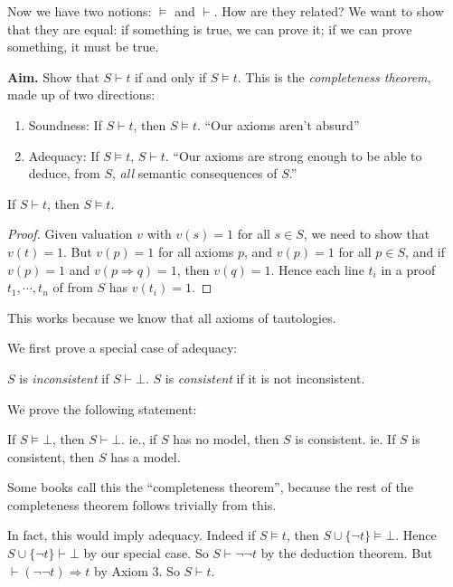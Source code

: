 \documentclass[a4paper]{article}
\begin{document}
Now we have two notions: $\models$ and $\vdash$. How are they related? We want to show that they are equal: if something is true, we can prove it; if we can prove something, it must be true.

\noindent\textbf{Aim.} Show that $S\vdash t$ if and only if $S\models t$.
This is the \emph{completeness theorem}, made up of two directions:
\begin{enumerate}
  \item Soundness: If $S\vdash t$, then $S\models t$. ``Our axioms aren't absurd''
  \item Adequacy: If $S\models t$, $S\vdash t$.  ``Our axioms are strong enough to be able to deduce, from $S$, \emph{all} semantic consequences of $S$.''
\end{enumerate}

\begin{prop}
  If $S\vdash t$, then $S\models t$.
\end{prop}

\begin{proof}
  Given valuation $v$ with $v(s) = 1$ for all $s\in S$, we need to show that $v(t) = 1$. But $v(p) = 1$ for all axioms $p$, and $v(p) = 1$ for all $p\in S$, and if $v(p) = 1$ and $v(p\Rightarrow q) = 1$, then $v(q) = 1$. Hence each line $t_i$ in a proof $t_1, \cdots, t_n$ of from $S$ has $v(t_i) = 1$. 
\end{proof}
This works because we know that all axioms of tautologies.

We first prove a special case of adequacy:
\begin{defi}[Consistent]
  $S$ is \emph{inconsistent} if $S\vdash \bot$. $S$ is \emph{consistent} if it is not inconsistent.
\end{defi}

We prove the following statement:
\begin{thm}
  If $S\models \bot$, then $S\vdash \bot$. ie., if $S$ has no model, then $S$ is consistent. ie. If $S$ is consistent, then $S$ has a model.

  \note Some books call this the ``completeness theorem'', because the rest of the completeness theorem follows trivially from this. 
\end{thm}

In fact, this would imply adequacy. Indeed if $S\models t$, then  $S\cup \{\neg t\}\models \bot$. Hence $S\cup \{\neg t\}\vdash \bot$ by our special case. So $S\vdash \neg \neg t$ by the deduction theorem. But $\vdash (\neg\neg t)\Rightarrow t$ by Axiom 3. So $S\vdash t$.
\end{document}
